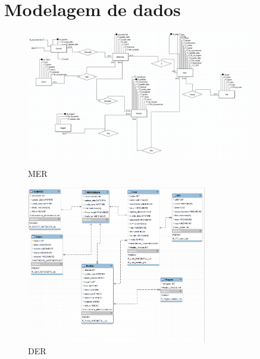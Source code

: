 \chapter{Modelagem de dados}

\begin{figure}
    \caption{MER}
    \includegraphics[width=0.9\textwidth]{exemplos/diagramas/mer.png}
\end{figure}

\newpage
\begin{figure}
    \caption{DER}
    \includegraphics[width=0.7\textwidth]{exemplos/diagramas/der.png}
\end{figure}

